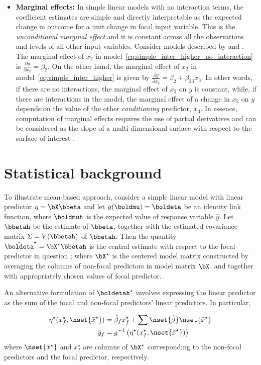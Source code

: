 \begin{itemize}
\item \textbf{Marginal effects:} In simple linear models with no interaction terms, the coefficient estimates are simple and directly interpretable as the expected change in outcome for a unit change in focal input variable. This is the \emph{unconditional marginal effect} and it is constant across all the observations and levels of all other input variables. Consider models described by  and . The marginal effect of $x_2$ in model~\ref{eq:simple_inter_higher_no_interaction} is $\frac{\partial y}{\partial x_2} = \beta_2$. On the other hand, the marginal effect of $x_2$ in model~\ref{eq:simple_inter_higher} is given by $\frac{\partial y}{\partial x_2} = \beta_2 + \beta_{23}x_3$. In other words, if there are no interactions, the marginal effect of $x_2$ on $y$ is constant, while, if there are interactions in the model, the marginal effect of a change in $x_2$ on $y$ depends on the value of the other \emph{conditioning} predictor, $x_3$. In essence, computation of marginal effects requires the use of partial derivatives and can be considered as the slope of a multi-dimensional surface with respect to the surface of interest \cite{leeper2017interpreting}. 
\end{itemize}

\section{Statistical background}

To illustrate mean-based approach, consider a simple linear model with linear predictor $\eta = \bX\bbeta$ and let $g(\boldmu) = \boldeta$ be an identity link function, where $\boldmuh$ is the expected value of response variable $\hat{y}$. Let $\bbetah$ be the estimate of $\bbeta$, together with the estimated covariance matrix $\Sigma = V(\bbetah)$ of $\bbetah$. Then the quantity $\hat{\boldeta}^\star = \bX^\star\bbetah$ is the central estimate with respect to the focal predictor in question \citep{fox2009effect}; where $\bX^\star$ is the centered model matrix constructed by averaging the columns of non-focal predictors in model matrix $\bX$, and together with appropriately chosen values of focal predictor.

An alternative formulation of $\boldetah^\star$ involves expressing the linear predictor as the sum of the focal and non-focal predictors' linear predictors. In particular, 

\begin{align}\label{eq:eta_mean}
\eta^\star(x^\star_f, \nset{{\bar{x}^\star}}) &= \hat{\beta}_f x^\star_f + \sum \nset{\hat{\beta}} \nset{{\bar{x}^\star}} \\
\hat{y}_f  &= g^{-1} \left(\eta^\star(x^\star_f, \nset{{\bar{x}^\star}})\right)
\end{align}
where $\nset{{\bar{x}^\star}}$ and $x^\star_f$ are columns of $\bX^\star$ corresponding to the non-focal predictors and the focal predictor, respectively.


